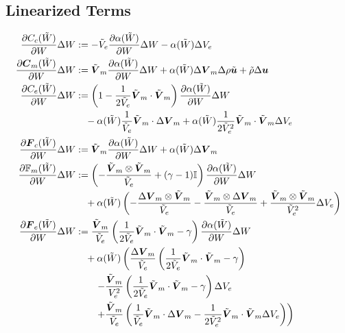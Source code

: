 \documentclass[Dissertation.tex]{subfiles}
\begin{document}
\subsection{Linearized Terms}
\begin{align*}
\frac{\partial C_c(\tilde W)}{\partial W}\Delta W&:=
	-\tilde V_e\frac{\partial\alpha(\tilde W)}{\partial W}\Delta W-\alpha(\tilde W)\Delta V_e
	\\
\frac{\partial\boldsymbol C_m(\tilde W)}{\partial W}\Delta W&:=
	\tilde{\boldsymbol V}_m\frac{\partial\alpha(\tilde W)}{\partial W}\Delta W+\alpha(\tilde W)\Delta\boldsymbol V_m
	\Delta\rho\tilde{\boldsymbol u}+\tilde\rho\Delta\boldsymbol u
	\\
\frac{\partial C_e(\tilde W)}{\partial W}\Delta W&:=
	\left( 1-\frac{1}{2\tilde V_e}\tilde{\boldsymbol V}_m\cdot\tilde{\boldsymbol V}_m \right)\frac{\partial\alpha(\tilde W)}{\partial W}\Delta W
	\\&\quad
	-\alpha(\tilde W)\frac{1}{\tilde V_e}\tilde{\boldsymbol V}_m\cdot\Delta\boldsymbol V_m
	+\alpha(\tilde W)\frac{1}{2\tilde V_e^2}\tilde{\boldsymbol V}_m\cdot\tilde{\boldsymbol V}_m\Delta V_e
	\\
\frac{\partial\boldsymbol F_c(\tilde W)}{\partial W}\Delta W&:=
	\tilde{\boldsymbol V}_m\frac{\partial\alpha(\tilde W)}{\partial W}\Delta W+\alpha(\tilde W)\Delta\boldsymbol V_m
	\\
\frac{\partial\mathbb{F}_m(\tilde W)}{\partial W}\Delta W&:=
	\left( -\frac{\tilde{\boldsymbol V}_m\otimes\tilde{\boldsymbol V}_m}{\tilde V_e}+(\gamma-1)\mathbb{I} \right)\frac{\partial\alpha(\tilde W)}{\partial W}\Delta W
	\\&\quad
	+\alpha(\tilde W)\left( 
	-\frac{\Delta\boldsymbol V_m\otimes\tilde{\boldsymbol V}_m}{\tilde V_e}
	-\frac{\tilde{\boldsymbol V}_m\otimes\Delta\boldsymbol V_m}{\tilde V_e}
	+\frac{\tilde{\boldsymbol V}_m\otimes\tilde{\boldsymbol V}_m}{\tilde V_e^2}\Delta V_e
	 \right)
	\\
\frac{\partial\boldsymbol F_e(\tilde W)}{\partial W}\Delta W&:=
	\frac{\tilde{\boldsymbol V}_m}{\tilde V_e}
	\left( \frac{1}{2\tilde V_e}\tilde{\boldsymbol V}_m\cdot\tilde{\boldsymbol V}_m-\gamma \right)\frac{\partial\alpha(\tilde W)}{\partial W}\Delta W
	\\&\quad
	+\alpha(\tilde W)\left(
	\frac{\Delta\boldsymbol V_m}{\tilde V_e}\left( \frac{1}{2\tilde V_e}\tilde{\boldsymbol V}_m\cdot\tilde{\boldsymbol V}_m-\gamma \right)
	\right.\\&\quad\quad\left.
	-\frac{\tilde{\boldsymbol V}_m}{V_e^2}\left( \frac{1}{2\tilde V_e}\tilde{\boldsymbol V}_m\cdot\tilde{\boldsymbol V}_m-\gamma \right)\Delta V_e
	\right.\\&\quad\quad\left.
	+\frac{\tilde{\boldsymbol V}_m}{\tilde V_e}\left( 
	\frac{1}{\tilde V_e}\tilde{\boldsymbol V}_m\cdot\Delta\boldsymbol V_m
	-\frac{1}{2\tilde V_e^2}\tilde{\boldsymbol V}_m\cdot\tilde{\boldsymbol V}_m\Delta V_e
	 \right)
	\right)
	\\
\end{align*}
\end{document}
